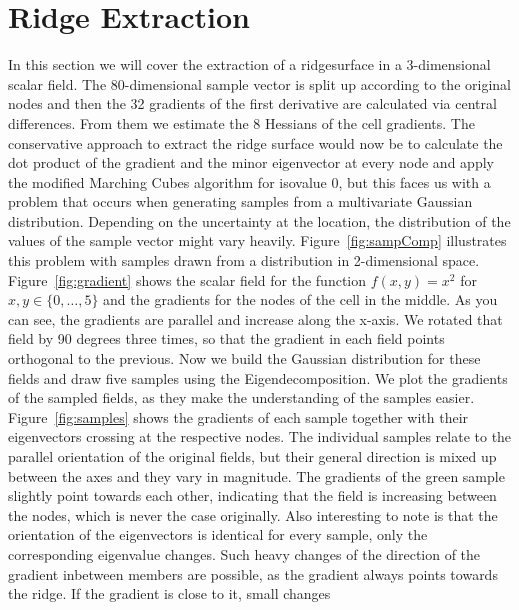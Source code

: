 \section{Ridge Extraction}\label{sec:ridgeextract}

In this section we will cover the extraction of a ridgesurface in a
3-dimensional scalar field. The 80-dimensional sample vector is split up
according to the original nodes and then the 32 gradients of the first
derivative are calculated via central differences. From them we estimate
the 8 Hessians of the cell gradients. The conservative approach to
extract the ridge surface would now be to calculate the dot product of
the gradient and the minor eigenvector at every node and apply the
modified Marching Cubes algorithm for isovalue 0, but this faces us with
a problem that occurs when generating samples from a multivariate
Gaussian distribution. Depending on the uncertainty at the location, the
distribution of the values of the sample vector might vary heavily.
Figure~\ref{fig:sampComp} illustrates this problem with samples drawn
from a distribution in 2-dimensional space. Figure~\ref{fig:gradient}
shows the scalar field for the function $f(x,y) = x^2$ for $x, y \in
\{0,\dots,5\}$ and the gradients for the nodes of the cell in the
middle. As you can see, the gradients are parallel and increase along
the x-axis. We rotated that field by 90 degrees three times, so that the
gradient in each field points orthogonal to the previous. Now we build
the Gaussian distribution for these fields and draw five samples using
the Eigendecomposition. We plot the gradients of the sampled fields, as
they make the understanding of the samples easier.
Figure~\ref{fig:samples} shows the gradients of each sample together
with their eigenvectors crossing at the respective nodes. The individual
samples relate to the parallel orientation of the original fields, but
their general direction is mixed up between the axes and they vary in
magnitude. The gradients of the green sample slightly point towards each
other, indicating that the field is increasing between the nodes, which
is never the case originally. Also interesting to note is that the
orientation of the eigenvectors is identical for every sample, only the
corresponding eigenvalue changes. Such heavy changes of the direction of
the gradient inbetween members are possible, as the gradient always
points towards the ridge. If the gradient is close to it, small changes
